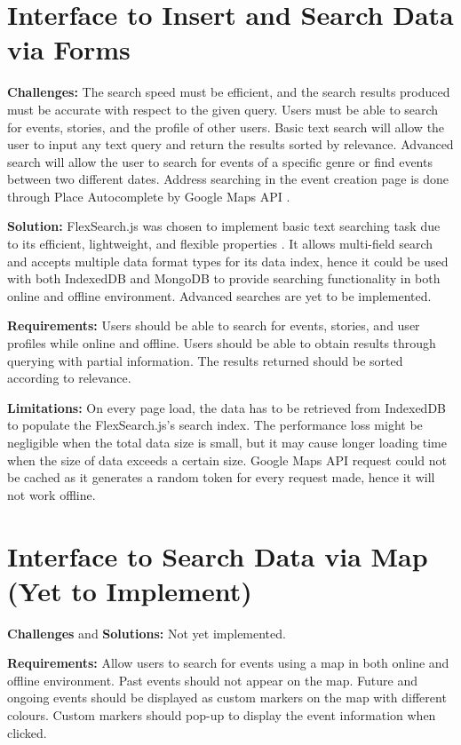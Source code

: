 \documentclass[11pt, a4paper]{article}
\begin{document}
\section{Interface to Insert and Search Data via Forms}
\textbf{Challenges:} The search speed must be efficient, and the search results produced must be
accurate with respect to the given query. Users must be able to search for events, stories, and
the profile of other users. Basic text search will allow the user to input any text query and return
the results sorted by relevance. Advanced search will allow the user to search for events of a
specific genre or find events between two different dates. Address searching in the event creation
page is done through Place Autocomplete by Google Maps API \cite{google_maps_api}.

\textbf{Solution:} FlexSearch.js \cite{flexsearch} was chosen to implement basic text searching
task due to its efficient, lightweight, and flexible properties \cite{flexsearch_benchmarkk}.
It allows multi-field search and accepts multiple data format types for its data index, hence
it could be used with both IndexedDB and MongoDB to provide searching functionality in both online
and offline environment. Advanced searches are yet to be implemented.

\textbf{Requirements:} Users should be able to search for events, stories, and user profiles while
online and offline. Users should be able to obtain results through querying with partial
information. The results returned should be sorted according to relevance.

\textbf{Limitations:} On every page load, the data has to be retrieved from IndexedDB to populate
the FlexSearch.js's search index. The performance loss might be negligible when the total data size
is small, but it may cause longer loading time when the size of data exceeds a certain size. Google Maps
API request could not be cached as it generates a random token for every request made, hence it will
not work offline.

\section{Interface to Search Data via Map (Yet to Implement)}
\textbf{Challenges} and \textbf{Solutions:} Not yet implemented.

\textbf{Requirements:} Allow users to search for events using a map in both online and offline
environment. Past events should not appear on the map. Future and ongoing events should be displayed
as custom markers on the map with different colours. Custom markers should pop-up to display the
event information when clicked.
\end{document}
